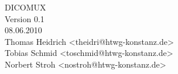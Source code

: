 %
%

\begin{titlepage}
\vspace*{7cm}

\begin{center}
\Huge
DICOMUX\\
\vspace{1cm}
\large
Version 0.1\\
08.06.2010 \\
\vspace{2cm}
Thomas Heidrich <theidri@htwg-konstanz.de>\\
Tobias Schmid <toschmid@htwg-konstanz.de>\\
Norbert Stroh <nostroh@htwg-konstanz.de>\\
\end{center}

\end{titlepage}

%
%